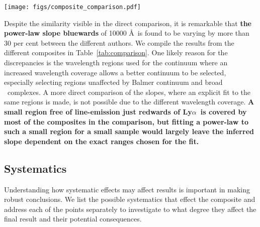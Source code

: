 \documentclass{aa}    %
\newcommand{\figlabel}[1]{\label{fig:#1}}
\newcommand{\Tab}[1]{Table~\ref{tab:#1}}
\newcommand{\tab}[1]{\Tab{#1}}
\newcommand{\sectlabel}[1]{\label{sect:#1}}
\newcommand{\lya}{Ly$\alpha$}
\newcommand{\feii}{\ion{Fe}{ii}}
\begin{document}
 \begin{figure*}[t!]
   \centering
   \texttt{[image: figs/composite\_comparison.pdf]}
   \caption[]{Comparison of different composites. The composites by
     \citet{Lusso2015, VandenBerk2001, Telfer2002, Francis1991} are
     normalized to the X-shooter composite at $\sim 1450$ \AA~and the
     composite by \citet{Glikman2006} is normalized to ours at $\sim
     3850$ \AA. Significant differences are visible blueward of
     \lya~due to differing IGM correction methods. Above 5000 \AA~
     significant host galaxy contamination is visible in the composite
     by \citet{VandenBerk2001}. Overplot in blue is a pure power law
     with slope $\alpha_\lambda = -1.70$ and normalized at $\sim 1450$ \AA.}
   \figlabel{composite_comparison}
 \end{figure*}
  
 
Despite the similarity visible in the direct comparison, it is
remarkable that \textbf{the power-law slope bluewards} of 10000 \AA~is found to
be varying by more than 30 per cent between the different authors. We
compile the results from the different composites in
\tab{comparison}. One likely reason for the discrepancies is the
wavelength regions used for the continuum where an increased
wavelength coverage allows a better continuum to be selected,
especially selecting regions unaffected by Balmer continuum and broad
\feii~complexes. A more direct comparison of the slopes, where an
explicit fit to the same regions is made, is not possible due to the
different wavelength coverage. \textbf{A small region free of line-emission just redwards of \lya~is covered by most of the composites in the comparison, but fitting a power-law to such a small region for a small sample would largely leave the inferred slope dependent on the exact ranges chosen for the fit.}





\subsection{Systematics}  \sectlabel{systematics}

Understanding how systematic effects may affect results is important in making
robust conclusions.
 We list the possible systematics that effect the composite and address each of
the points separately to investigate to what degree they affect the final result
and their potential consequences.
\end{document}
